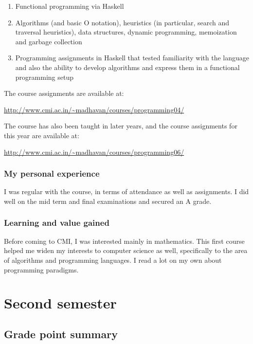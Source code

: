 \documentclass[a4paper]{amsart}
\begin{document}
\begin{enumerate}

\item Functional programming via Haskell

\item Algorithms (and basic O notation), 
  heuristics (in particular, search and traversal heuristics), data structures, dynamic programming,
  memoization and garbage collection

\item Programming assignments in Haskell that tested familiarity with the language and also the ability to develop
  algorithms and express them in a functional programming setup

\end{enumerate}

The course assignments are available at:

\url{http://www.cmi.ac.in/~madhavan/courses/programming04/}

The course has also been taught in later years, and the course assignments for this year are available at:

\url{http://www.cmi.ac.in/~madhavan/courses/programming06/}

\subsubsection{My personal experience}

I was regular with the course, in terms of attendance as well as assignments. I did well on the mid term
and final examinations and secured an A grade.

\subsubsection{Learning and value gained}

Before coming to CMI, I was interested mainly in mathematics. This first course helped me widen my interests
to computer science as well, specifically to the area of algorithms and programming languages. I read a lot on my
own about programming paradigms.

\section{Second semester}\label{sem2}

\subsection{Grade point summary}\label{sem2gps}
\end{document}
